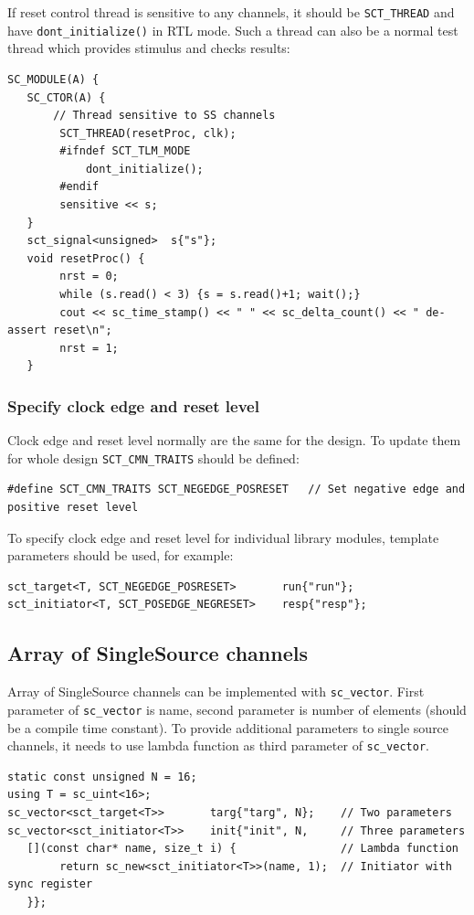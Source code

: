 If reset control thread is sensitive to any channels, it should be {\tt SCT\_THREAD} and have {\tt dont\_initialize()} in RTL mode. Such a thread can also be a normal test thread which provides stimulus and checks results:
\begin{lstlisting}[style=mycpp]
SC_MODULE(A) {
   SC_CTOR(A) {
       // Thread sensitive to SS channels
        SCT_THREAD(resetProc, clk);
        #ifndef SCT_TLM_MODE
            dont_initialize();
        #endif
        sensitive << s;
   }
   sct_signal<unsigned>  s{"s"};
   void resetProc() {
        nrst = 0; 
        while (s.read() < 3) {s = s.read()+1; wait();}
        cout << sc_time_stamp() << " " << sc_delta_count() << " de-assert reset\n";
        nrst = 1; 
   }
\end{lstlisting}

\subsubsection{Specify clock edge and reset level}

Clock edge and reset level normally are the same for the design. To update them for whole design {\tt SCT\_CMN\_TRAITS} should be defined:
\begin{lstlisting}[style=mycpp]
#define SCT_CMN_TRAITS SCT_NEGEDGE_POSRESET   // Set negative edge and positive reset level
\end{lstlisting}

To specify clock edge and reset level for individual library modules, template parameters should be used, for example:
\begin{lstlisting}[style=mycpp]
sct_target<T, SCT_NEGEDGE_POSRESET>       run{"run"};
sct_initiator<T, SCT_POSEDGE_NEGRESET>    resp{"resp"};
\end{lstlisting}


\subsection{Array of SingleSource channels}

Array of SingleSource channels can be implemented with {\tt sc\_vector}. First parameter of {\tt sc\_vector} is name, second parameter is number of elements (should be a compile time constant). To provide additional parameters to single source channels, it needs to use lambda function as third parameter of {\tt sc\_vector}.

\begin{lstlisting}[style=mycpp]
static const unsigned N = 16;
using T = sc_uint<16>;
sc_vector<sct_target<T>>       targ{"targ", N};    // Two parameters 
sc_vector<sct_initiator<T>>    init{"init", N,     // Three parameters
   [](const char* name, size_t i) {                // Lambda function         
        return sc_new<sct_initiator<T>>(name, 1);  // Initiator with sync register
   }}; 
\end{lstlisting}

